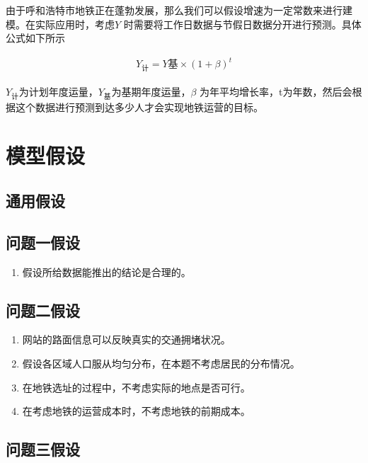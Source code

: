 \documentclass[12pt,a4paper]{mcmthesis}
\begin{document}
    由于呼和浩特市地铁正在蓬勃发展，那么我们可以假设增速为一定常数来进行建模。在实际应用时，考虑$Y$ 时需要将工作日数据与节假日数据分开进行预测。具体公式如下所示

    \begin{equation*}
        \begin{aligned}
            Y_{计}=Y{基} \times (1+\beta)^t
        \end{aligned}
    \end{equation*}

    $Y_{计}$为计划年度运量，$Y_{基}$为基期年度运量，$\beta$ 为年平均增长率，t为年数，然后会根据这个数据进行预测到达多少人才会实现地铁运营的目标。


    \section{模型假设}

    \subsection{通用假设}

    \subsection{问题一假设}
    \begin{enumerate}
        \item 假设所给数据能推出的结论是合理的。
    \end{enumerate}

    \subsection{问题二假设}
    \begin{enumerate}
        \item 网站的路面信息可以反映真实的交通拥堵状况。
        \item 假设各区域人口服从均匀分布，在本题不考虑居民的分布情况。
        \item 在地铁选址的过程中，不考虑实际的地点是否可行。
        \item 在考虑地铁的运营成本时，不考虑地铁的前期成本。

    \end{enumerate}

    \subsection{问题三假设}
\end{document}
